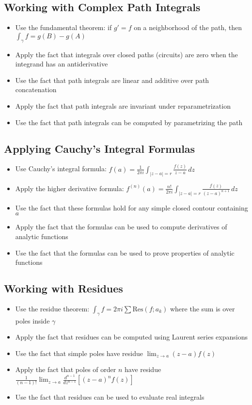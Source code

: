 \subsection*{Working with Complex Path Integrals}
\begin{itemize}
\item Use the fundamental theorem: if $g' = f$ on a neighborhood of the path, then $\int_\gamma f = g(B) - g(A)$
\item Apply the fact that integrals over closed paths (circuits) are zero when the integrand has an antiderivative
\item Use the fact that path integrals are linear and additive over path concatenation
\item Apply the fact that path integrals are invariant under reparametrization
\item Use the fact that path integrals can be computed by parametrizing the path
\end{itemize}

\subsection*{Applying Cauchy's Integral Formulas}
\begin{itemize}
\item Use Cauchy's integral formula: $f(a) = \frac{1}{2\pi i} \int_{|z-a|=r} \frac{f(z)}{z-a} \, dz$
\item Apply the higher derivative formula: $f^{(n)}(a) = \frac{n!}{2\pi i} \int_{|z-a|=r} \frac{f(z)}{(z-a)^{n+1}} \, dz$
\item Use the fact that these formulas hold for any simple closed contour containing $a$
\item Apply the fact that the formulas can be used to compute derivatives of analytic functions
\item Use the fact that the formulas can be used to prove properties of analytic functions
\end{itemize}

\subsection*{Working with Residues}
\begin{itemize}
\item Use the residue theorem: $\int_\gamma f = 2\pi i \sum \text{Res}(f; a_k)$ where the sum is over poles inside $\gamma$
\item Apply the fact that residues can be computed using Laurent series expansions
\item Use the fact that simple poles have residue $\lim_{z \to a} (z-a)f(z)$
\item Apply the fact that poles of order $n$ have residue $\frac{1}{(n-1)!} \lim_{z \to a} \frac{d^{n-1}}{dz^{n-1}}[(z-a)^n f(z)]$
\item Use the fact that residues can be used to evaluate real integrals
\end{itemize}


